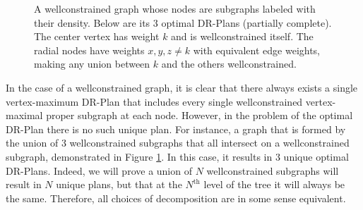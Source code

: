 \documentclass[11pt]{article}
\newcommand{\tedge}[5]{\draw[#3] (#1)-- node[e, #5] (e#4) {#4} (#2)}
\begin{document}
\begin{figure}
\begin{center}


\end{center}

\caption{A wellconstrained graph whose nodes are subgraphs labeled with their density. Below are its 3 optimal DR-Plans (partially complete). The center vertex has weight $k$ and is wellconstrained itself. The radial nodes have weights $x,y,z \neq k$ with equivalent edge weights, making any union between $k$ and the others wellconstrained.}
\label{3-plans}
\end{figure}

In the case of a wellconstrained graph, it is clear that there always exists a single vertex-maximum DR-Plan that includes every single wellconstrained vertex-maximal proper subgraph at each node. However, in the problem of the optimal DR-Plan there is no such unique plan. For instance, a graph that is formed by the union of 3 wellconstrained subgraphs that all intersect on a wellconstrained subgraph, demonstrated in Figure \ref{3-plans}. In this case, it results in $3$ unique optimal DR-Plans. Indeed, we will prove a union of $N$ wellconstrained subgraphs will result in $N$ unique plans, but that at the $N^{\text{th}}$ level of the tree it will always be the same. Therefore, all choices of decomposition are in some sense equivalent.
\end{document}
